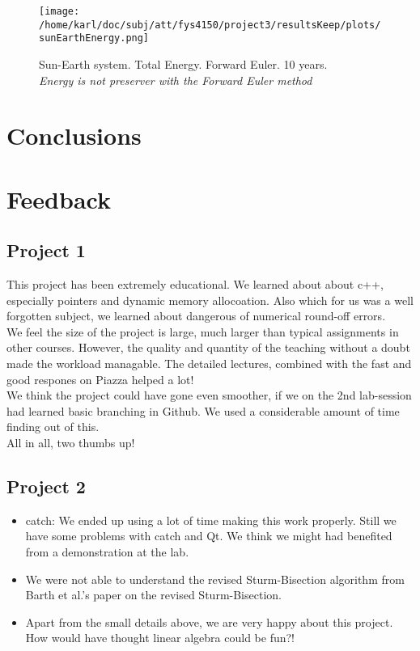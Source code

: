 \documentclass{article}
\begin{document}
\begin{figure}[H]
	\centering
	\texttt{[image: /home/karl/doc/subj/att/fys4150/project3/resultsKeep/plots/sunEarthEnergy.png]}
	\caption{Sun-Earth system. Total Energy. Forward Euler. 10 years. \\ \textit{Energy is not preserver with the Forward Euler method}}
	\label{1}
\end{figure}


\section{Conclusions}






\section{Feedback}
\subsection{Project 1}
This project has been extremely educational. We learned about about c++, especially pointers and dynamic memory allocoation. Also which for us was a well forgotten subject, we learned about dangerous of numerical round-off errors. \\

We feel the size of the project is large, much larger than typical assignments in other courses. However, the quality and quantity of the teaching without a doubt made the workload managable. The detailed lectures, combined with the fast and good respones on Piazza helped a lot!\\

We think the project could have gone even smoother, if we on the 2nd lab-session had learned basic branching in Github. We used a considerable amount of time finding out of this.\\

All in all, two thumbs up!

\subsection{Project 2}
\begin{itemize}
	\item  catch: We ended up using a lot of time making this work properly. Still we have some problems with catch and Qt. We think we might had benefited from a demonstration at the lab.
	
	\item We were not able to understand the revised Sturm-Bisection algorithm from Barth et al.'s \cite{barth} paper on the revised Sturm-Bisection. 
	
	\item Apart from the small details above, we are very happy about this project. How would have thought linear algebra could be fun?!
\end{itemize}
\end{document}

